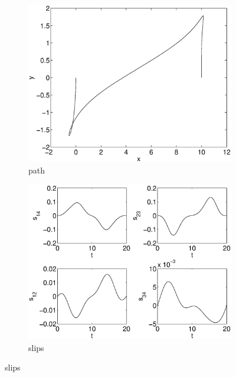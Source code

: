 \begin{figure}[h]
\begin{subfigure}[b]{\textwidth}
\centering
\includegraphics[height=0.3\textheight]{img/final_15_1_20_path.eps}
\caption{path}
\end{subfigure}

\begin{subfigure}[b]{\textwidth}
\centering
\includegraphics[height=0.3\textheight]{img/final_15_1_20_slips.eps}
\caption{slips}
\end{subfigure}


\end{figure}
